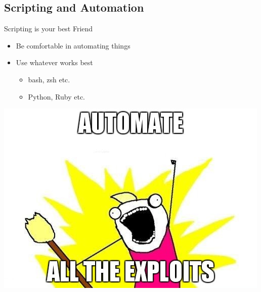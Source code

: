 



\subsection{Scripting and Automation}

\begin{frame}
  {Scripting is your best Friend}

  \begin{itemize}
    \item Be comfortable in automating things
    \item Use whatever works best
      \begin{itemize}
        \item bash, zsh etc.
        \item Python, Ruby etc.
      \end{itemize}
  \end{itemize}

  \begin{center}
    \includegraphics[height=0.5\textheight]{../images/automatealltheexploits.jpg}
  \end{center}
\end{frame}


